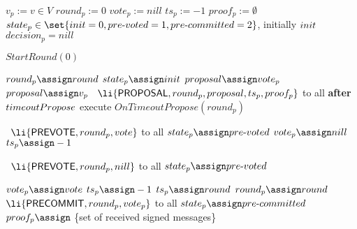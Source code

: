 \begin{algorithm}[htb!]
\def\baselinestretch{1}
\scriptsize\raggedright
\begin{algorithmic}[1]
\SHORTSPACE
\INIT{}
  \STATE $v_p := v \in V$  
  \STATE $round_p := 0$    
  \STATE $vote_p := nill$ 
  \STATE $ts_p := -1$ 
  \STATE $proof_p := \emptyset$ 
  \STATE $state_p \in \set{\initState=0,\preVoted=1,\preCommitted=2}$, initially $init$
  \STATE $decision_p = nill$
  
\ENDINIT

\SPACE
{}
  \STATE $StartRound(0)$
\ENDUPON

\SPACE
{} \label{line:tab:startRound}
\STATE $round_p \assign round$
\STATE $state_p \assign init$
\STATE $proposal \assign vote_p$
\ELSE 
\STATE $proposal \assign v_p$
\ENDIF	  	  
\STATE \PBroadcast\ $\li{\Propose,round_p,proposal,ts_p, proof_p}$ to all \label{line:tab:send-propose}
\ENDIF
\STATE \textbf{after} $timeoutPropose$ execute $OnTimeoutPropose(round_p)$
\ENDFUNCTION


\SPACE
{} \label{line:tab:recvInit}
   \STATE \PBroadcast \ $\li{\Prepare,round_p,vote}$ to all \label{line:tab:send-echo}
   \STATE $state_p \assign \preVoted$ \label{line:tab:setStateToEchoed}
     \STATE $vote_p \assign nill$
     \STATE $ts_p \assign -1$
    \ENDIF
 \ENDIF
\ENDUPON

\SPACE
{} \label{line:tab:onTimeoutPropose}
\STATE \PBroadcast \ $\li{\Prepare,round_p,nill}$ to all 
\STATE $state_p \assign \preVoted$  
\ENDIF	
\ENDFUNCTION

\SPACE
{} \label{line:tab:recvEcho}
 \STATE $vote_p \assign vote$   \label{line:tab:setV}
  \STATE $ts_p \assign -1$
 \ELSE 
 	\STATE $ts_p \assign round$ \label{line:tab:setTs}
 \ENDIF
 \STATE $round_p \assign round$
 \STATE \PBroadcast \ $\li{\Commit,round_p,vote_p}$ to all \label{line:tab:send-commit}
 \STATE $state_p \assign \preCommitted$ \label{line:tab:setStateToCommitted}
 \STATE $proof_p \assign$ \{set of received signed messages\}
\ENDUPON


\end{algorithmic}
\end{algorithm}

